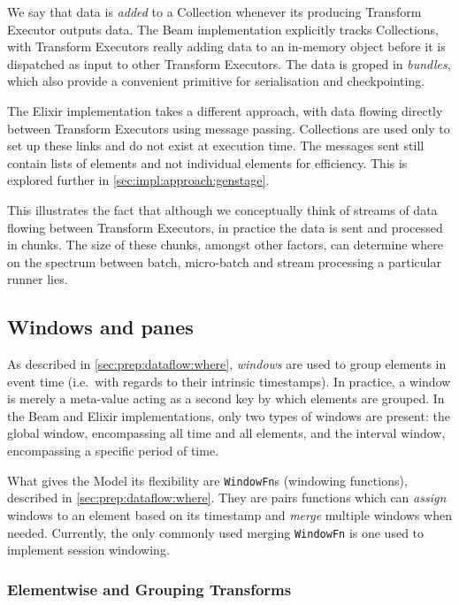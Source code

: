 We say that data is \emph{added} to a Collection whenever its producing Transform Executor outputs data.
The Beam implementation explicitly tracks Collections, with Transform Executors really adding data to an in-memory object before it is dispatched as input to other Transform Executors.
The data is groped in \emph{bundles}, which also provide a convenient primitive for serialisation and checkpointing.

The Elixir implementation takes a different approach, with data flowing directly between Transform Executors using message passing.
Collections are used only to set up these links and do not exist at execution time.
The messages sent still contain lists of elements and not individual elements for efficiency.
This is explored further in \cref{sec:impl:approach:genstage}.

This illustrates the fact that although we conceptually think of streams of data flowing between Transform Executors, in practice the data is sent and processed in chunks.
The size of these chunks, amongst other factors, can determine where on the spectrum between batch, micro-batch and stream processing a particular runner lies.

\subsection{Windows and panes}\label{sec:impl:dataflow:windows-panes}

As described in \cref{sec:prep:dataflow:where}, \emph{windows} are used to group elements in event time (i.e.\ with regards to their intrinsic timestamps).
In practice, a window is merely a meta-value acting as a second key by which elements are grouped.
In the Beam and Elixir implementations, only two types of windows are present: the global window, encompassing all time and all elements, and the interval window, encompassing a specific period of time.

What gives the Model its flexibility are \verb|WindowFn|s (windowing functions), described in \cref{sec:prep:dataflow:where}.
They are pairs functions which can \emph{assign} windows to an element based on its timestamp and \emph{merge} multiple windows when needed.
Currently, the only commonly used merging \verb|WindowFn| is one used to implement session windowing.

\subsubsection{Elementwise and Grouping Transforms}


